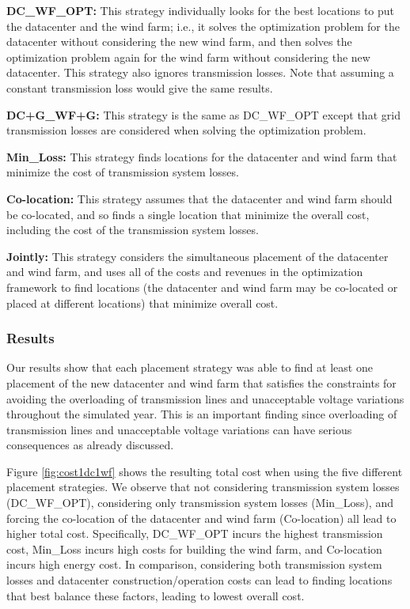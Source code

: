 \textbf{DC\_WF\_OPT:} This strategy individually looks for the best
locations to put the datacenter and the wind farm; i.e., it solves the
optimization problem for the datacenter without considering the new
wind farm, and then solves the optimization problem again for the wind
farm without considering the new datacenter.  This strategy also
ignores transmission losses.  Note that assuming
a constant transmission loss would give the same results.

\textbf{DC+G\_WF+G:} This strategy is the same as DC\_WF\_OPT except
that grid transmission losses are considered when solving the optimization
problem.

\textbf{Min\_Loss:} This strategy finds locations for the datacenter
and wind farm that minimize the cost of transmission system losses.

\textbf{Co-location:} This strategy assumes that the datacenter and
wind farm should be co-located, and so finds a single location
that minimize the overall cost, including the cost of
the transmission system losses.

\textbf{Jointly:} This strategy considers the simultaneous placement
of the datacenter and wind farm, and uses all of the costs and
revenues in the optimization framework to find locations (the
datacenter and wind farm may be co-located or placed at different
locations) that minimize overall cost.

\subsubsection{Results}

Our results show that each placement strategy was able to find at
least one placement of the new datacenter and wind farm that satisfies
the constraints for avoiding the overloading of transmission lines and
unacceptable voltage variations throughout the simulated year.  This
is an important finding since overloading of transmission lines and
unacceptable voltage variations can have serious consequences as
already discussed.

Figure \ref{fig:cost1dc1wf} shows the resulting total cost when using
the five different placement strategies.  We observe that not
considering transmission system losses (DC\_WF\_OPT), considering only
transmission system losses (Min\_Loss), and forcing the co-location of
the datacenter and wind farm (Co-location) all lead to higher total cost.
Specifically, DC\_WF\_OPT incurs the highest transmission cost,
Min\_Loss incurs high costs for building the wind farm, and
Co-location incurs high energy cost.  In comparison, considering both
transmission system losses and datacenter construction/operation costs
can lead to finding locations that best balance these factors, leading
to lowest overall cost.

